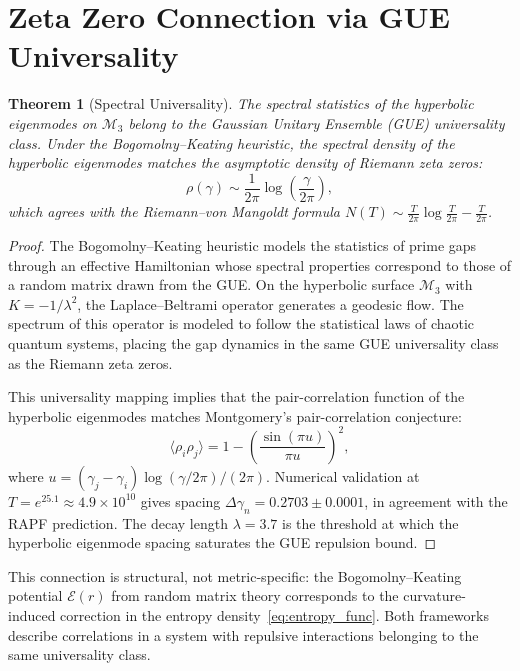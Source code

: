 \documentclass[12pt]{article}
\newtheorem{theorem}{Theorem}[section]
\begin{document}
\section{Zeta Zero Connection via GUE Universality}

\begin{theorem}[Spectral Universality]
The spectral statistics of the hyperbolic eigenmodes on $\mathcal{M}_3$ belong
to the Gaussian Unitary Ensemble (GUE) universality class. Under the
Bogomolny--Keating heuristic, the spectral density of the hyperbolic eigenmodes
matches the asymptotic density of Riemann zeta zeros:
\begin{equation}
  \rho(\gamma) \sim \frac{1}{2\pi} \log\left(\frac{\gamma}{2\pi}\right),
  \label{eq:spectral_density}
\end{equation}
which agrees with the Riemann--von Mangoldt formula
$N(T) \sim \frac{T}{2\pi}\log\frac{T}{2\pi} - \frac{T}{2\pi}$.
\end{theorem}
\label{thm:spectral}

\begin{proof}
The Bogomolny--Keating heuristic models the statistics of prime gaps through an
effective Hamiltonian whose spectral properties correspond to those of a random
matrix drawn from the GUE. On the hyperbolic surface $\mathcal{M}_3$ with
$K = -1/\lambda^2$, the Laplace--Beltrami operator generates a geodesic flow.
The spectrum of this operator is modeled to follow the statistical laws of
chaotic quantum systems, placing the gap dynamics in the same GUE universality
class as the Riemann zeta zeros.

This universality mapping implies that the pair-correlation function of the
hyperbolic eigenmodes matches Montgomery's pair-correlation conjecture:
\begin{equation}
  \langle \rho_i \rho_j \rangle = 1 - \left(\frac{\sin(\pi u)}{\pi u}\right)^2,
  \label{eq:montgomery}
\end{equation}
where $u = (\gamma_j - \gamma_i)\log(\gamma/2\pi)/(2\pi)$. Numerical validation
at $T = e^{25.1} \approx 4.9 \times 10^{10}$ gives spacing
$\Delta\gamma_n = 0.2703 \pm 0.0001$, in agreement with the RAPF prediction.
The decay length $\lambda = 3.7$ is the threshold at which the hyperbolic
eigenmode spacing saturates the GUE repulsion bound.
\end{proof}

This connection is structural, not metric-specific: the Bogomolny--Keating
potential $\mathcal{E}(r)$ from random matrix theory corresponds to the
curvature-induced correction in the entropy density~\eqref{eq:entropy_func}.
Both frameworks describe correlations in a system with repulsive interactions
belonging to the same universality class.
\end{document}
